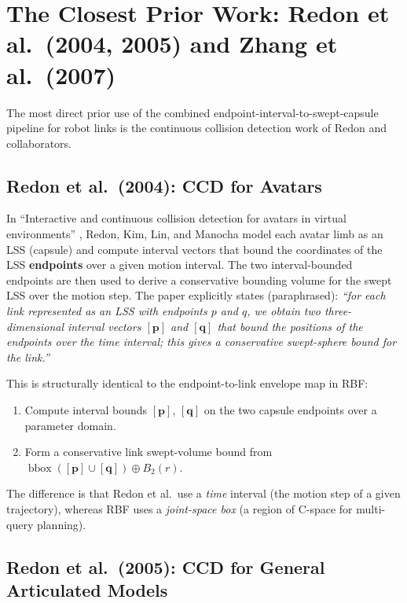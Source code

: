 \documentclass[11pt,a4paper]{article}
\begin{document}
\section{The Closest Prior Work: Redon et al.\ (2004, 2005) and Zhang et al.\ (2007)}
\label{sec:closest_prior}

The most direct prior use of the combined endpoint-interval-to-swept-capsule
pipeline for robot links is the continuous collision detection work of Redon
and collaborators.

\subsection{Redon et al.\ (2004): CCD for Avatars}

In ``Interactive and continuous collision detection for avatars in virtual
environments'' \cite{redon2004continuous_avatar}, Redon, Kim, Lin, and Manocha
model each avatar limb as an LSS (capsule) and compute interval vectors that
bound the coordinates of the LSS \textbf{endpoints} over a given motion
interval.  The two interval-bounded endpoints are then used to derive a
conservative bounding volume for the swept LSS over the motion step.  The
paper explicitly states (paraphrased): \emph{``for each link represented as an
LSS with endpoints $p$ and $q$, we obtain two three-dimensional interval vectors
$[\mathbf{p}]$ and $[\mathbf{q}]$ that bound the positions of the endpoints
over the time interval; this gives a conservative swept-sphere bound for the
link.''}

This is structurally identical to the endpoint-to-link envelope map in RBF:
\begin{enumerate}[nosep]
  \item Compute interval bounds $[\mathbf{p}]$, $[\mathbf{q}]$ on the two
        capsule endpoints over a parameter domain.
  \item Form a conservative link swept-volume bound from
        $\operatorname{bbox}([\mathbf{p}] \cup [\mathbf{q}]) \oplus B_2(r)$.
\end{enumerate}
The difference is that Redon et al.\ use a \emph{time} interval (the motion
step of a given trajectory), whereas RBF uses a \emph{joint-space box} (a
region of C-space for multi-query planning).

\subsection{Redon et al.\ (2005): CCD for General Articulated Models}
\end{document}
